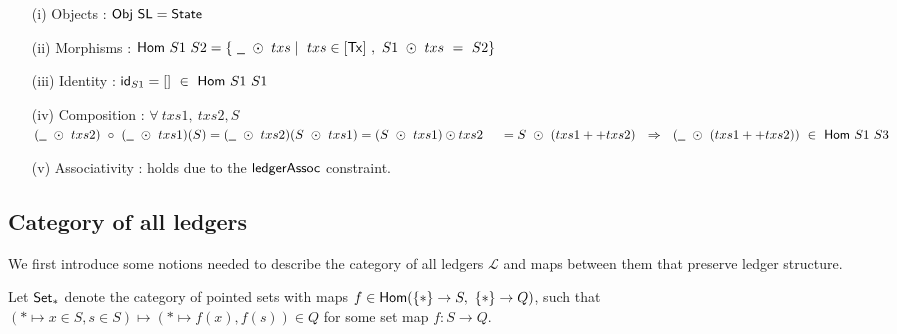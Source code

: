 \begin{itemize}
  \item[(i)] Objects : $\mathsf{Obj}~\mathsf{SL} = \mathsf{State}$ \newline

  \item[(ii)] Morphisms : $\fun{Hom}~S1~S2 = \{ ~\wcard~\odot~txs \mid ~txs \in [\Tx]~,~S1~ \odot~txs~=~S2 \}$ \newline

  \item[(iii)] Identity : $\mathsf{id}_{S1} = [] ~\in~\mathsf{Hom}~S1~S1 $ \newline

  \item[(iv)] Composition : $\forall~txs1,~txs2, S$ \\
  $(\wcard~\odot~txs2) ~\circ~(\wcard~\odot~txs1) (S) = (\wcard~\odot~txs2) (S~\odot~txs1) = (S~\odot~txs1) \odot txs2  \\
  ~~~~ =  S~\odot~(txs1 ++ txs2)~~\Rightarrow ~~(\wcard~\odot~(txs1 ++ txs2))~\in ~\fun{Hom}~S1~S3$

  \item[(v)] Associativity : holds due to the $\mathsf{ledgerAssoc}$ constraint.

\end{itemize}


\subsection{Category of all ledgers}
\label{sec:all-ledgers}

We first introduce some notions needed to describe the category of all ledgers $\mathcal{L}$
and maps between them that preserve ledger structure.

Let $\mathsf{Set}_{*}$ denote the category of pointed sets with maps $f \in \mathsf{Hom} (\{*\} \to S,~\{*\} \to Q)$,
such that $({*} \mapsto x \in S, s \in S) \mapsto (* \mapsto f(x), f(s)) \in Q$ for some
set map $f : S \to Q$.

